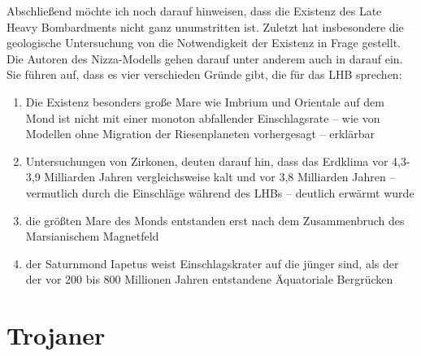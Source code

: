 \documentclass[12pt,a4paper,twoside]{article}
\renewcommand{\cite}{\citep}
\begin{document}
Abschließend möchte ich noch darauf hinweisen, dass die Existenz des Late Heavy Bombardments nicht ganz unumstritten ist. Zuletzt hat insbesondere die geologische Untersuchung von \cite{Spudis2011} die Notwendigkeit der Existenz in Frage gestellt. Die Autoren des Nizza-Modells gehen darauf unter anderem auch in \cite{Brasser2009} darauf ein. Sie führen auf, dass es vier verschieden Gründe gibt, die für das LHB sprechen:
\begin{enumerate}
\item Die Existenz besonders große Mare wie Imbrium und Orientale auf dem Mond ist nicht mit einer monoton abfallender Einschlagsrate -- wie von Modellen ohne Migration der Riesenplaneten vorhergesagt -- erklärbar \cite{Bottke2007}
\item Untersuchungen von Zirkonen, deuten darauf hin, dass das Erdklima vor 4,3-3,9 Milliarden Jahren vergleichsweise kalt und vor 3,8 Milliarden Jahren -- vermutlich durch die Einschläge während des LHBs -- deutlich erwärmt wurde\cite{Mojzsis2001,Trail2007}
\item die größten Mare des Monds entstanden erst nach dem Zusammenbruch des Marsianischem Magnetfeld \cite{Lillis2006,Lillis2007}
\item der Saturnmond Iapetus weist Einschlagskrater auf die jünger sind, als der der vor 200 bis 800 Millionen Jahren entstandene Äquatoriale Bergrücken\cite{Castillo-Rogez2007}
\end{enumerate}

\FloatBarrier
\section{Trojaner}\label{Trojaner}
\newcommand{\PJS}{P_J/P_S}
\end{document}
